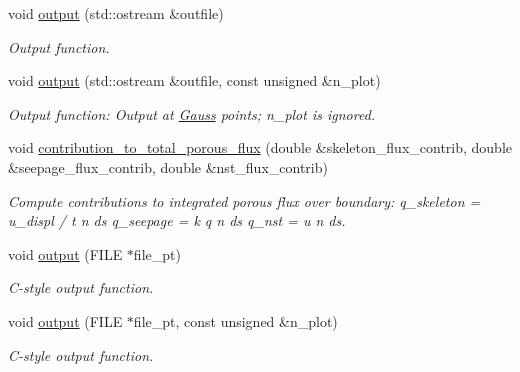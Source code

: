 \begin{DoxyCompactItemize}
void \hyperlink{classoomph_1_1LinearisedAxisymPoroelasticBJS__FSIElement_a995babfb257bffea27ce2c3476b9e642}{output} (std\+::ostream \&outfile)
\begin{DoxyCompactList}\small\item\em Output function. \end{DoxyCompactList}\item 
void \hyperlink{classoomph_1_1LinearisedAxisymPoroelasticBJS__FSIElement_a22f814c3e375302e323fdd3b021c10f8}{output} (std\+::ostream \&outfile, const unsigned \&n\+\_\+plot)
\begin{DoxyCompactList}\small\item\em Output function\+: Output at \hyperlink{classoomph_1_1Gauss}{Gauss} points; n\+\_\+plot is ignored. \end{DoxyCompactList}\item 
void \hyperlink{classoomph_1_1LinearisedAxisymPoroelasticBJS__FSIElement_afab87c435ee121a692dc0f051f2252ab}{contribution\+\_\+to\+\_\+total\+\_\+porous\+\_\+flux} (double \&skeleton\+\_\+flux\+\_\+contrib, double \&seepage\+\_\+flux\+\_\+contrib, double \&nst\+\_\+flux\+\_\+contrib)
\begin{DoxyCompactList}\small\item\em Compute contributions to integrated porous flux over boundary\+: q\+\_\+skeleton =   u\+\_\+displ /  t  n ds q\+\_\+seepage =  k q  n ds q\+\_\+nst =  u  n ds. \end{DoxyCompactList}\item 
void \hyperlink{classoomph_1_1LinearisedAxisymPoroelasticBJS__FSIElement_a91ca551e9f88bd3aeaff35aa338e2ca2}{output} (F\+I\+LE $\ast$file\+\_\+pt)
\begin{DoxyCompactList}\small\item\em C-\/style output function. \end{DoxyCompactList}\item 
void \hyperlink{classoomph_1_1LinearisedAxisymPoroelasticBJS__FSIElement_a9a4a6cf7877a1d7cadff50b800adb848}{output} (F\+I\+LE $\ast$file\+\_\+pt, const unsigned \&n\+\_\+plot)
\begin{DoxyCompactList}\small\item\em C-\/style output function. \end{DoxyCompactList}\end{DoxyCompactItemize}
